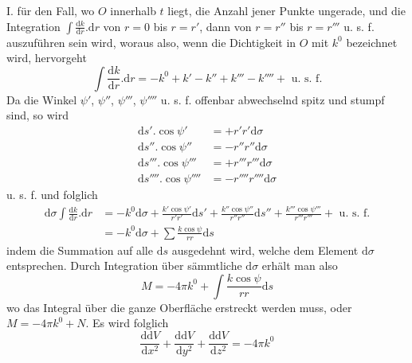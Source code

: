 I. für den Fall, wo $O$ innerhalb $t$ liegt, die Anzahl jener Punkte ungerade, und die Integration $\int\frac{\mathrm{d}k}{\mathrm{d}r}.\mathrm{d}r$ von $r=0$ bis $r=r'$, dann von $r=r''$ bis $r=r'''$ u. s. f. auszuführen sein wird, woraus also, wenn die Dichtigkeit in $O$ mit $k^0$ bezeichnet wird, hervorgeht
\[
\int\frac{\mathrm{d}k}{\mathrm{d}r}.\mathrm{d}r=-k^0+k'-k''+k'''-k''''+\text{ u. s. f.}
\]
Da die Winkel $\psi'$, $\psi''$, $\psi'''$, $\psi''''$ u. s. f. offenbar abwechselnd spitz und stumpf sind, so wird
\[
\begin{aligned}
\mathrm{d}s'.\cos\psi'&=+r'r'\mathrm{d}\sigma\\
\mathrm{d}s''.\cos\psi''&=-r''r''\mathrm{d}\sigma\\
\mathrm{d}s'''.\cos\psi'''&=+r'''r'''\mathrm{d}\sigma\\
\mathrm{d}s''''.\cos\psi''''&=-r''''r''''\mathrm{d}\sigma
\end{aligned}
\]
u. s. f. und folglich
\[
\begin{aligned}
\mathrm{d}\sigma\int\frac{\mathrm{d}k}{\mathrm{d}r}.\mathrm{d}r&=-k^0\mathrm{d}\sigma+\frac{k'\cos\psi'}{r'r'}\mathrm{d}s'+\frac{k''\cos\psi''}{r''r''}\mathrm{d}s''+\frac{k'''\cos\psi'''}{r'''r'''}+\text{ u. s. f.}\\
&=-k^0\mathrm{d}\sigma+\sum\frac{k\cos\psi}{rr}\mathrm{d}s
\end{aligned}
\]
indem die Summation auf alle $\mathrm{d}s$ ausgedehnt wird, welche dem Element $\mathrm{d}\sigma$ entsprechen. Durch Integration über sämmtliche $\mathrm{d}\sigma$ erhält man also
\[
M=-4\pi k^0+\int\frac{k\cos\psi}{rr}\mathrm{d}s
\]
wo das Integral über die ganze Oberfläche erstreckt werden muss, oder $M=-4\pi k^0+N$. Es wird folglich
\[
\frac{\mathrm{d}\mathrm{d}V}{\mathrm{d}x^2}+\frac{\mathrm{d}\mathrm{d}V}{\mathrm{d}y^2}+\frac{\mathrm{d}\mathrm{d}V}{\mathrm{d}z^2}=-4\pi k^0
\]

